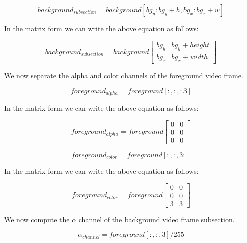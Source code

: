 \documentclass[ebook,12pt,oneside,openany]{memoir}
\begin{document}
\begin{equation}
    background_{subsection} = background[bg_y:bg_y + h, bg_x:bg_x + w]
\end{equation}

In the matrix form we can write the above equation as follows:

\begin{equation}
    background_{subsection} = background \begin{bmatrix} 
        bg_{y} & bg_{y} + height \\
        bg_{x} & bg_{x} + width
    \end{bmatrix}
\end{equation}

We now separate the alpha and color channels of the foreground video frame.

\begin{equation}
    foreground_{alpha} = foreground[:, :, :3]
\end{equation}

In the matrix form we can write the above equation as follows:

\begin{equation}
    foreground_{alpha} = foreground \begin{bmatrix} 
        0 & 0 \\
        0 & 0 \\
        0 & 0
    \end{bmatrix}
\end{equation}

\begin{equation}
    foreground_{color} = foreground[:, :, 3:]
\end{equation}

In the matrix form we can write the above equation as follows:

\begin{equation}
    foreground_{color} = foreground \begin{bmatrix} 
        0 & 0 \\
        0 & 0 \\
        3 & 3
    \end{bmatrix}
\end{equation}

We now compute the $\alpha$ channel of the background video frame subsection.

\begin{equation}
    \alpha_{channel} = foreground[:, :, 3] / 255
\end{equation}
\end{document}
